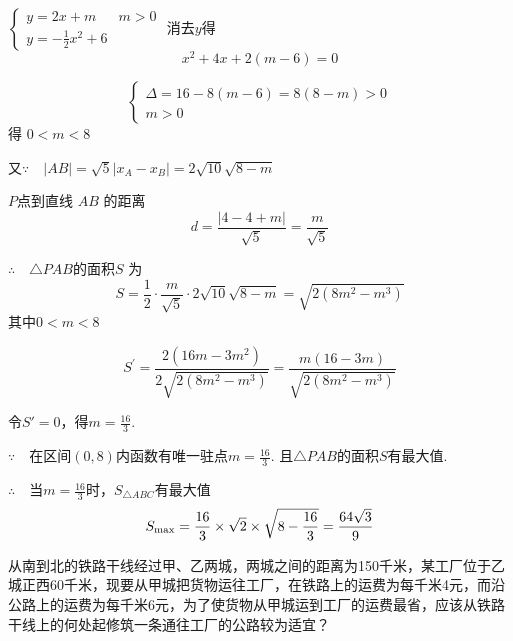 \begin{solution}
$\begin{cases}
    y=2x+m& m>0\\
    y=-\frac{1}{2}x^{2}+6
\end{cases}$ 
消去$y$得
$$x^2+4x+2(m-6)=0$$

\[\begin{cases}
    \Delta =16-8(m-6)=8(8-m)>0\\
    m>0
\end{cases}\]
得  $0<m<8$

又$\because\quad | AB| = \sqrt {5}\left | x_{A}- x_{B}\right |=2\sqrt{10}\sqrt{8-m}$

$P$点到直线 $AB$ 的距离
$$d=\frac{|4-4+m|}{\sqrt{5}}=\frac{m}{\sqrt{5}}$$

$\therefore\quad \triangle PAB$的面积$S$ 为
$$S=\frac{1}{2}\cdot\frac{m}{\sqrt{5}}\cdot2\sqrt{10}\sqrt{8-m}=\sqrt{2(8m^{2}-m^{3})}$$
其中$0<m<8$

$$S^{\prime}=\frac{2(16m-3m^{2})}{2\sqrt{2(8m^{2}-m^{3})}}=\frac{m(16-3m)}{\sqrt{2(8m^{2}-m^{3})}}$$

    令$S'=0$，得$m=\frac{16}{3}$.

$\because\quad $在区间$(0,8)$内函数有唯一驻点$m=\frac{16}{3}$. 且$\triangle PAB$的面积$S$有最大值.

$\therefore\quad $当$m=\frac{16}{3}$时，$S_{\triangle ABC}$有最大值
\[S_{\max}= \dfrac{16}{3}\times \sqrt{2}\times\sqrt{8-\dfrac{16}{3}}=\dfrac{64\sqrt{3}}{9} \]
\end{solution}

\begin{example}
    从南到北的铁路干线经过甲、乙两城，两城之间的距离为150千米，某工厂位于乙城正西60千米，现要从甲城把货物运往工厂，在铁路上的运费为每千米4元，而沿公路上的运费为每千米6元，为了使货物从甲城运到工厂的运费最省，应该从铁路干线上的何处起修筑一条通往工厂的公路较为适宜？
\end{example}

